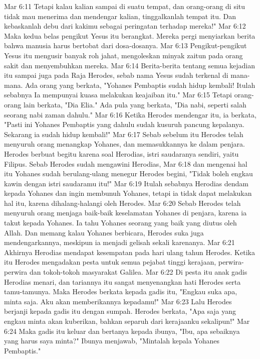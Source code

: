 Mar 6:11  Tetapi kalau kalian sampai di suatu tempat, dan orang-orang di situ tidak mau menerima dan mendengar kalian, tinggalkanlah tempat itu. Dan kebaskanlah debu dari kakimu sebagai peringatan terhadap mereka!"
Mar 6:12  Maka kedua belas pengikut Yesus itu berangkat. Mereka pergi menyiarkan berita bahwa manusia harus bertobat dari dosa-dosanya.
Mar 6:13  Pengikut-pengikut Yesus itu mengusir banyak roh jahat, mengoleskan minyak zaitun pada orang sakit dan menyembuhkan mereka.
Mar 6:14  Berita-berita tentang semua kejadian itu sampai juga pada Raja Herodes, sebab nama Yesus sudah terkenal di mana-mana. Ada orang yang berkata, "Yohanes Pembaptis sudah hidup kembali! Itulah sebabnya Ia mempunyai kuasa melakukan keajaiban itu."
Mar 6:15  Tetapi orang-orang lain berkata, "Dia Elia." Ada pula yang berkata, "Dia nabi, seperti salah seorang nabi zaman dahulu."
Mar 6:16  Ketika Herodes mendengar itu, ia berkata, "Pasti ini Yohanes Pembaptis yang dahulu sudah kusuruh pancung kepalanya. Sekarang ia sudah hidup kembali!"
Mar 6:17  Sebab sebelum itu Herodes telah menyuruh orang menangkap Yohanes, dan memasukkannya ke dalam penjara. Herodes berbuat begitu karena soal Herodias, istri saudaranya sendiri, yaitu Filipus. Sebab Herodes sudah mengawini Herodias,
Mar 6:18  dan mengenai hal itu Yohanes sudah berulang-ulang menegur Herodes begini, "Tidak boleh engkau kawin dengan istri saudaramu itu!"
Mar 6:19  Itulah sebabnya Herodias dendam kepada Yohanes dan ingin membunuh Yohanes, tetapi ia tidak dapat melakukan hal itu, karena dihalang-halangi oleh Herodes.
Mar 6:20  Sebab Herodes telah menyuruh orang menjaga baik-baik keselamatan Yohanes di penjara, karena ia takut kepada Yohanes. Ia tahu Yohanes seorang yang baik yang diutus oleh Allah. Dan memang kalau Yohanes berbicara, Herodes suka juga mendengarkannya, meskipun ia menjadi gelisah sekali karenanya.
Mar 6:21  Akhirnya Herodias mendapat kesempatan pada hari ulang tahun Herodes. Ketika itu Herodes mengadakan pesta untuk semua pejabat tinggi kerajaan, perwira-perwira dan tokoh-tokoh masyarakat Galilea.
Mar 6:22  Di pesta itu anak gadis Herodias menari, dan tariannya itu sangat menyenangkan hati Herodes serta tamu-tamunya. Maka Herodes berkata kepada gadis itu, "Engkau suka apa, minta saja. Aku akan memberikannya kepadamu!"
Mar 6:23  Lalu Herodes berjanji kepada gadis itu dengan sumpah. Herodes berkata, "Apa saja yang engkau minta akan kuberikan, bahkan separuh dari kerajaanku sekalipun!"
Mar 6:24  Maka gadis itu keluar dan bertanya kepada ibunya, "Ibu, apa sebaiknya yang harus saya minta?" Ibunya menjawab, "Mintalah kepala Yohanes Pembaptis."
